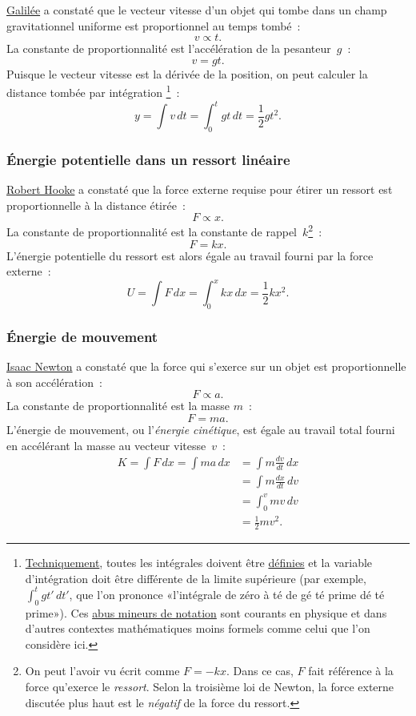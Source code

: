 \href{https://fr.wikipedia.org/wiki/Galil%C3%A9e_(savant)}{Galilée} a constaté
que le vecteur vitesse d'un objet qui tombe dans un champ gravitationnel
uniforme est proportionnel au temps tombé~:
\[ v \propto t. \]
La constante de proportionnalité est l'accélération de la pesanteur~$g$~:
\[ v = g t. \]
Puisque le vecteur vitesse est la dérivée de la position, on peut calculer la
distance tombée par
intégration\ns
\footnote{\href{https://translate.google.com/translate?hl=en&sl=en&tl=fr&u=https://www.explainxkcd.com/wiki/index.php/1475:_Technically}{Techniquement},
toutes les intégrales doivent être
\href{https://translate.google.com/#view=home&op=translate&sl=en&tl=fr&text=https%3A%2F%2Fmathworld.wolfram.com%2FDefiniteIntegral.html}{définies}
et la variable d'intégration doit être
différente de la limite supérieure (par exemple, $\int_{0}^{t} gt'\, dt'$, que
l'on prononce «\ns l'intégrale de zéro à té de gé té prime dé té prime\ns »). Ces
\href{https://fr.wikipedia.org/wiki/Abus_de_notation}{abus mineurs de notation}
sont courants en physique et dans d'autres contextes mathématiques moins formels
comme celui que l'on considère ici.}~:
\[ y = \int v\,dt = \int_0^t gt\,dt = \textstyle{\frac{1}{2}} gt^2. \]


    \subsubsection{Énergie potentielle dans un ressort linéaire} %
    \label{sec:potential_energy_in_a_linear_spring}

\href{https://fr.wikipedia.org/wiki/Robert_Hooke}{Robert Hooke} a constaté que
la force externe requise pour étirer un ressort est proportionnelle à la
distance étirée~:
\[ F \propto x. \]
La constante de proportionnalité est la constante de rappel~$k$\ns\footnote{On
peut l'avoir vu écrit comme $F=-kx$. Dans ce cas, $F$ fait référence à la
force qu'exerce le \emph{ressort}. Selon la troisième loi de Newton, la force
externe discutée plus haut est le \emph{négatif} de la force du ressort.}~:
\[ F = k x. \]
L'énergie potentielle du ressort est alors égale au travail fourni par la force
externe~:
\[ U = \int F\,dx = \int_0^x kx\,dx = \textstyle{\frac{1}{2}} kx^2. \]

    \subsubsection{Énergie de mouvement} %
    \label{sec:energy_of_motion}

\href{https://fr.wikipedia.org/wiki/Isaac_Newton}{Isaac Newton} a constaté que
la force qui s'exerce sur un objet est proportionnelle à son accélération~:
\[ F \propto a. \]
La constante de proportionnalité est la masse $m$~:
\[ F = m a. \]
L'énergie de mouvement, ou l'\emph{énergie cinétique}, est égale au travail
total fourni en accélérant la masse au vecteur vitesse~$v$~:
\[
\begin{split}
K = \int F\,dx = \int ma\,dx & = \int m\frac{dv}{dt}\,dx \\ & = \int m\frac{dx}{dt}\,dv \\ & = \int_0^v mv\,dv \\ & = \textstyle{\frac{1}{2}} mv^2.
\end{split}
\]

